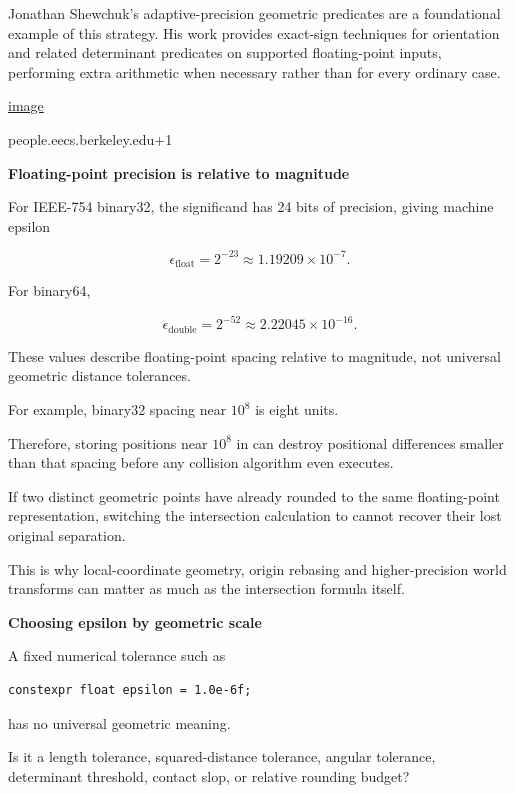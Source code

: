 Jonathan Shewchuk's adaptive-precision geometric predicates are a foundational example of this strategy. His work provides exact-sign techniques for orientation and related determinant predicates on supported floating-point inputs, performing extra arithmetic when necessary rather than for every ordinary case. 

\href{https://www.google.com/s2/favicons?domain=https://people.eecs.berkeley.edu&sz=32}{image}

people.eecs.berkeley.edu+1

\textbf{Floating-point precision is relative to magnitude}

For IEEE-754 binary32, the significand has 24 bits of precision, giving machine epsilon

\[
\epsilon_{\text{float}}=2^{-23}\approx1.19209\times10^{-7}.
\]

For binary64,

\[
\epsilon_{\text{double}}=2^{-52}\approx2.22045\times10^{-16}.
\]

These values describe floating-point spacing relative to magnitude, not universal geometric distance tolerances.

For example, binary32 spacing near \(10^8\) is eight units.

Therefore, storing positions near \(10^8\) in  can destroy positional differences smaller than that spacing before any collision algorithm even executes.

If two distinct geometric points have already rounded to the same floating-point representation, switching the intersection calculation to  cannot recover their lost original separation.

This is why local-coordinate geometry, origin rebasing and higher-precision world transforms can matter as much as the intersection formula itself.

\textbf{Choosing epsilon by geometric scale}

A fixed numerical tolerance such as

\begin{verbatim}
constexpr float epsilon = 1.0e-6f;
\end{verbatim}

has no universal geometric meaning.

Is it a length tolerance, squared-distance tolerance, angular tolerance, determinant threshold, contact slop, or relative rounding budget?

